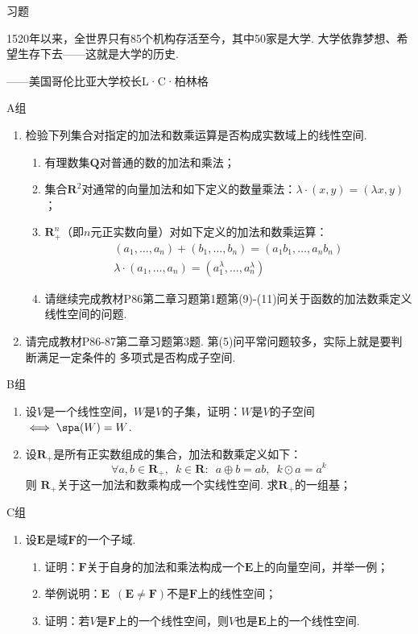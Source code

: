 \centerline{\heiti \Large 习题}
\vspace{2ex}
{\kaishu 1520年以来，全世界只有85个机构存活至今，其中50家是大学. 大学依靠梦想、希望生存下去——这就是大学的历史.}
\begin{flushright}
    \kaishu
    ——美国哥伦比亚大学校长L·C·柏林格
\end{flushright}
\centerline{\heiti A组}
\begin{enumerate}
    \item 检验下列集合对指定的加法和数乘运算是否构成实数域上的线性空间.
    \begin{enumerate}[label=(\arabic*)]
        \item 有理数集$\mathbf{Q}$对普通的数的加法和乘法；

        \item 集合$\mathbf{R}^2$对通常的向量加法和如下定义的数量乘法：$\lambda\cdot(x,y)=(\lambda x,y)$；

        \item $\mathbf{R}_+^n$（即$n$元正实数向量）对如下定义的加法和数乘运算：
        \begin{gather*}
            (a_1,\ldots,a_n)+(b_1,\ldots,b_n)=(a_1b_1,\ldots,a_nb_n) \\
            \lambda\cdot(a_1,\ldots,a_n)=(a_1^\lambda,\ldots,a_n^\lambda)
        \end{gather*}

        \item 请继续完成教材P86第二章习题第1题第(9)-(11)问关于函数的加法数乘定义线性空间的问题.
    \end{enumerate}
    \item 请完成教材P86-87第二章习题第3题. 第(5)问平常问题较多，实际上就是要判断满足一定条件的
          多项式是否构成子空间.
\end{enumerate}
\centerline{\heiti B组}
\begin{enumerate}
    \item 设$V$是一个线性空间，$W$是$V$的子集，证明：$W$是$V$的子空间$\iff \spa(W)=W$.
    \item 设$\mathbf{R}_+$是所有正实数组成的集合，加法和数乘定义如下：
    \[ \forall a,b \in \mathbf{R}_+,\enspace k\in \mathbf{R}\colon\enspace a\oplus b = ab,\enspace k\odot a = a^k \]
    则 $\mathbf{R}_+$关于这一加法和数乘构成一个实线性空间. 求$\mathbf{R}_+$的一组基；
\end{enumerate}
\centerline{\heiti C组}
\begin{enumerate}
    \item 设$\mathbf{E}$是域$\mathbf{F}$的一个子域.
    \begin{enumerate}[label=(\arabic*)]
        \item 证明：$\mathbf{F}$关于自身的加法和乘法构成一个$\mathbf{E}$上的向量空间，并举一例；

        \item 举例说明：$\mathbf{E}\enspace(\mathbf{E}\neq \mathbf{F})$不是$\mathbf{F}$上的线性空间；

        \item 证明：若$V$是$\mathbf{F}$上的一个线性空间，则$V$也是$\mathbf{E}$上的一个线性空间.
    \end{enumerate}
\end{enumerate}
